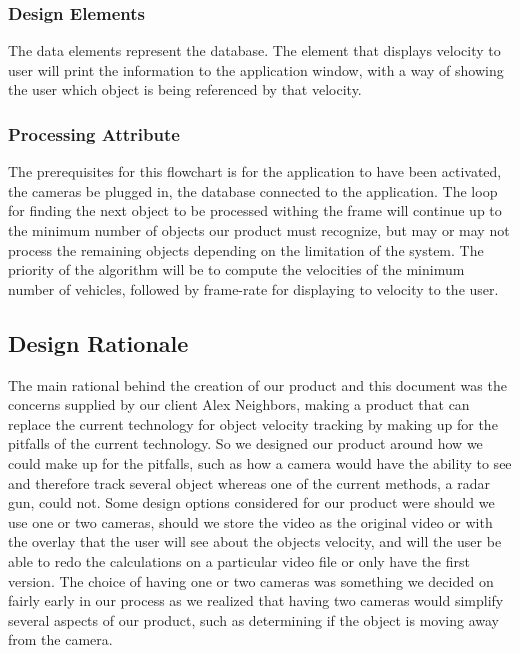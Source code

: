 \documentclass[letterpaper,10pt,onecolumn,draftclsnofoot]{IEEEtran}
\begin{document}
\subsubsection{Design Elements}
The data elements represent the database. 
The element that displays velocity to user will print the information to the application window, with a way of showing the user which object is being referenced by that velocity.


\subsubsection{Processing Attribute}
The prerequisites for this flowchart is for the application to have been activated, the cameras be plugged in, the database connected to the application. 
The loop for finding the next object to be processed withing the frame will continue up to the minimum number of objects our product must recognize, but may or may not process the remaining objects depending on the limitation of the system.
The priority of the algorithm will be to compute the velocities of the minimum number of vehicles, followed by frame-rate for displaying to velocity to the user.




\subsection{Design Rationale}
The main rational behind the creation of our product and this document was the concerns supplied by our client Alex Neighbors, making a product that can replace the current technology for object velocity tracking by making up for the pitfalls of the current technology.
So we designed our product around how we could make up for the pitfalls, such as how a camera would have the ability to see and therefore track several object whereas one of the current methods, a radar gun, could not.
Some design options considered for our product were should we use one or two cameras, should we store the video as the original video or with the overlay that the user will see about the objects velocity, and will the user be able to redo the calculations on a particular video file or only have the first version. 
The choice of having one or two cameras was something we decided on fairly early in our process as we realized that having two cameras would simplify several aspects of our product, such as determining if the object is moving away from the camera. 
\end{document}
